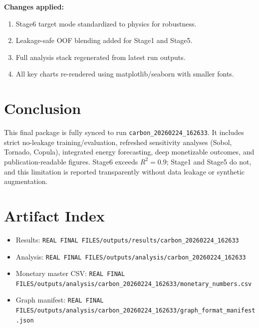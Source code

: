 \documentclass[11pt]{article}
\begin{document}
\textbf{Changes applied:}
\begin{enumerate}[leftmargin=1.2em]
  \item Stage6 target mode standardized to physics for robustness.
  \item Leakage-safe OOF blending added for Stage1 and Stage5.
  \item Full analysis stack regenerated from latest run outputs.
  \item All key charts re-rendered using matplotlib/seaborn with smaller fonts.
\end{enumerate}

\section{Conclusion}
This final package is fully synced to run \texttt{carbon\_20260224\_162633}. It includes strict no-leakage training/evaluation, refreshed sensitivity analyses (Sobol, Tornado, Copula), integrated energy forecasting, deep monetizable outcomes, and publication-readable figures. Stage6 exceeds $R^2=0.9$; Stage1 and Stage5 do not, and this limitation is reported transparently without data leakage or synthetic augmentation.

\section*{Artifact Index}
\begin{itemize}[leftmargin=1.2em]
  \item Results: \texttt{REAL FINAL FILES/outputs/results/carbon\_20260224\_162633}
  \item Analysis: \texttt{REAL FINAL FILES/outputs/analysis/carbon\_20260224\_162633}
  \item Monetary master CSV: \texttt{REAL FINAL FILES/outputs/analysis/carbon\_20260224\_162633/monetary\_numbers.csv}
  \item Graph manifest: \texttt{REAL FINAL FILES/outputs/analysis/carbon\_20260224\_162633/graph\_format\_manifest.json}
\end{itemize}
\end{document}
